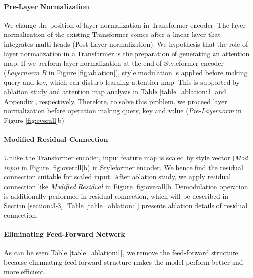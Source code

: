 \documentclass[10pt,twocolumn,letterpaper]{article}
\begin{document}
\paragraph{Pre-Layer Normalization}
We change the position of layer normalization in Transformer encoder. The layer normalization of the existing Transformer comes after a linear layer that integrates multi-heads (Post-Layer normalization). We hypothesis that the role of layer normalization in a Transformer is the preparation of generating an attention map. If we perform layer normalization at the end of Styleformer encoder (\textit{Layernorm B} in Figure \ref{fig:ablation}), style modulation is applied before making query and key, which can disturb learning attention map. This is supported by ablation study and attention map analysis in Table \ref{table_ablation:1} and Appendix , respectively. 
Therefore, to solve this problem, we proceed layer normalization before operation making query, key and value (\textit{Pre-Layernorm} in Figure \ref{fig:overall}b) 

\paragraph{Modified Residual Connection}
Unlike the Transformer encoder, input feature map is scaled by style vector (\textit{Mod input} in Figure \ref{fig:overall}b) in Styleformer encoder. We hence find the residual connection suitable for scaled input. After ablation study, we apply residual connection like \textit{Modified Residual} in Figure \ref{fig:overall}b. Demodulation operation is additionally performed in residual connection, which will be described in Section \ref{section:3-3}. Table \ref{table_ablation:1} presents ablation details of residual connection. 





\paragraph{Eliminating Feed-Forward Network}


As can be seen Table \ref{table_ablation:1}, we remove the feed-forward structure because eliminating feed forward structure makes the model perform better and more efficient.
\end{document}
